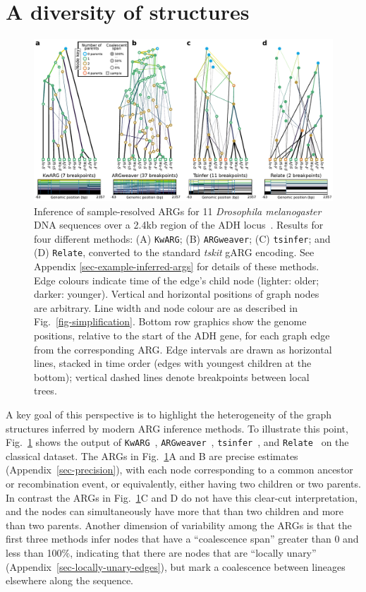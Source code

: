 \documentclass[9pt,twocolumn,twoside]{gsajnl}
\newcommand{\tsinfer}[0]{\texttt{tsinfer}}
\newcommand{\kwarg}[0]{\texttt{KwARG}}
\newcommand{\argweaver}[0]{\texttt{ARGweaver}}
\newcommand{\relate}[0]{\texttt{Relate}}
\begin{document}
\section{A diversity of structures}
\begin{figure} \begin{center}
\includegraphics[width=\textwidth]{illustrations/inference.pdf} \end{center}
\caption{\label{fig-inferred-args} Inference of sample-resolved ARGs for 11
\textit{Drosophila melanogaster} DNA sequences over a 2.4kb
region of the ADH locus~\citep{kreitman1983nucleotide}.
Results for four different methods:
(A) \kwarg; (B) \argweaver; (C) \tsinfer; and (D) \relate, converted 
to the standard \emph{tskit} gARG encoding. See
Appendix \ref{sec-example-inferred-args} for details of these methods.
Edge colours indicate time of the edge's child node
(lighter: older; darker: younger).
Vertical and horizontal positions of graph nodes are arbitrary.
Line width and node colour are as described in Fig.~\ref{fig-simplification}.
Bottom row graphics show the genome positions, relative to the start of
the ADH gene, for each graph edge from the corresponding ARG. Edge intervals
are drawn as horizontal lines, stacked in time order (edges with youngest
children at the bottom); vertical dashed lines denote breakpoints between
local trees.
}
\end{figure}
A key goal of this perspective is to highlight the heterogeneity of
the graph structures inferred by modern ARG inference methods.
To illustrate this point, Fig.~\ref{fig-inferred-args} shows the 
output of 
\kwarg~\citep{ignatieva2021kwarg},
\argweaver~\citep{rasmussen2014genome},
\tsinfer~\citep{kelleher2019inferring},
and \relate~\citep{speidel2019method}
on the classical \cite{kreitman1983nucleotide} dataset. 
The ARGs in Fig.~\ref{fig-inferred-args}A and B are precise 
estimates (Appendix~\ref{sec-precision}),
with each node corresponding to a common ancestor 
or recombination event, or  equivalently, either having two children
or two parents.
In contrast the ARGs in Fig.~\ref{fig-inferred-args}C and D do not 
have this clear-cut interpretation, and the nodes
can simultaneously have more that than two children and more
than two parents. Another dimension of variability among the ARGs
is that the first three methods infer nodes that have
a ``coalescence span''  greater than 0 and less than 100\%, indicating that there 
are nodes that are ``locally unary'' (Appendix~\ref{sec-locally-unary-edges}),
but mark a coalescence between lineages elsewhere along the sequence.
\end{document}

